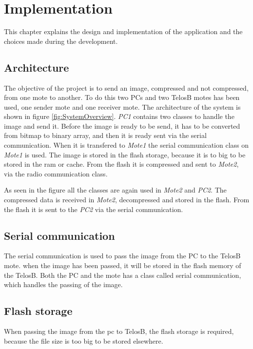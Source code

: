 \chapter{Implementation}
\label{chp:impl}

This chapter explains the design and implementation of the application and the choices made during the development.

\section{Architecture}
The objective of the project is to send an image, compressed and not compressed, from one mote to another. To do this two PCs and two TelosB motes has been used, one sender mote and one receiver mote. The architecture of the system is shown in figure \ref{fig:SystemOverview}. \emph{PC1} contains two classes to handle the image and send it. Before the image is ready to be send, it has to be converted from bitmap to binary array, and then it is ready sent via the serial communication. When it is transfered to \emph{Mote1} the serial communication class on \emph{Mote1} is used. The image is stored in the flash storage, because it is to big to be stored in the ram or cache. From the flash it is compressed and sent to \emph{Mote2}, via the radio communication class.


As seen in the figure all the classes are again used in \emph{Mote2} and \emph{PC2}. The compressed data is received in \emph{Mote2}, decompressed and stored in the flash. From the flash it is sent to the \emph{PC2} via the serial communication. 

\section{Serial communication}
The serial communication is used to pass the image from the PC to the TelosB mote. when the image has been passed, it will be stored in the flash memory of the TelosB. Both the PC and the mote has a class called serial communication, which handles the passing of the image.

\section{Flash storage}
When passing the image from the pc to TelosB, the flash storage is required, because the file size is too big to be stored elsewhere.

